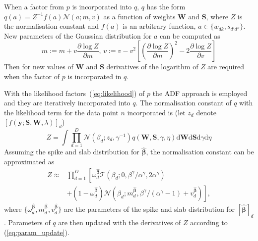 \documentclass{article}
\begin{document}
  When a factor from $p$ is incorporated into $q$, $q$ has the form $q(a) = Z^{-1}f(a)\mathcal{N}(a; m, v)$ as a function of weights $\mathbf{W}$ and $\mathbf{S}$,
  where $Z$ is the normalisation constant and $f(a)$ is an arbitrary function, $a \in \{w_{dk}, s_{d'd''}\}$. New parameters of the Gaussian distribution for $a$ can be computed as~\cite{minka2001thesis}
  \begin{equation}
  \label{eq:param_update}
  m:= m + v \frac{\partial \log Z}{\partial m}, \,
  v:= v - v^2\left[ \left(\frac{\partial \log Z}{\partial m}\right)^2 - 2 \frac{\partial \log Z}{\partial v}\right]
  \end{equation}
Then for new values of $\mathbf{W}$ and $\mathbf{S}$ derivatives of the logarithm of $Z$ are required when the factor of $p$ is incorporated in $q$.
  
  With the likelihood factors~(\ref{eq:likelihood}) of $p$ the ADF approach is employed and they are iteratively incorporated into $q$. The normalisation constant of $q$ with the likelihood term for the data point $n$ incorporated is (let $z_d$ denote  $[f(\mathbf{y} ; \mathbf{S}, \mathbf{W}, \lambda)]_d$) %
  \begin{equation}
  Z  = \int \prod_{d=1}^{D} \mathcal{N}(\beta_d ; z_d, \gamma^{-1}) q(\mathbf{W}, \mathbf{S}, \gamma, \eta) \mathrm{d}\mathbf{W} \mathrm{d}\mathbf{S} \mathrm{d}\gamma \mathrm{d}\eta
  \end{equation}
  Assuming the spike and slab distribution for $\widehat{\boldsymbol\beta}$, the normalisation constant can be approximated as
  \begin{equation}
  \label{eq:Z}
  \begin{split}
  Z \approx & \prod_{d=1}^D \left[\omega^{\widehat{\boldsymbol\beta}}_d  \mathcal{T}\left(\beta_d ; 0, \beta^\gamma / \alpha^\gamma, 2\alpha^\gamma\right) \right.\\
  &\left. + (1 - \omega^{\widehat{\boldsymbol\beta}}_d)\mathcal{N}(\beta_d ; m^{\widehat{\boldsymbol\beta}}_d,  \beta^\gamma / (\alpha^\gamma - 1) + v^{\widehat{\boldsymbol\beta}}_d)\right],
  \end{split}
  \end{equation}
  where $\{\omega^{\widehat{\boldsymbol\beta}}_d, m^{\widehat{\boldsymbol\beta}}_d, v^{\widehat{\boldsymbol\beta}}_d\}$ are the parameters of the spike and slab distribution for $[\widehat{\boldsymbol\beta}]_d$. Parameters of $q$ are then updated with the derivatives of $Z$ according to (\ref{eq:param_update}).
  
\end{document}
